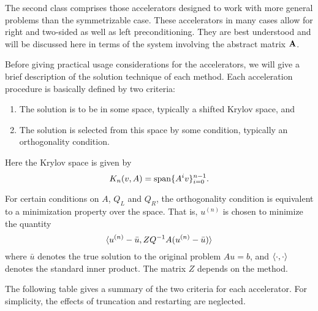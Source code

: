     The second class comprises those accelerators designed to work
with more general problems than the symmetrizable case.  These
accelerators in many cases allow for right and two-sided as well
as left preconditioning.  They are best understood and will be
discussed here in terms of the system involving the abstract matrix
${\bf A}$.

    Before giving practical usage considerations for the accelerators, 
we will give a brief description of the solution technique of each 
method.  Each acceleration procedure is basically defined by two 
criteria:
\begin{enumerate}
 \item The solution is to be in some space, typically a shifted 
       Krylov space, and 
 \item The solution is selected from this space by some condition, 
       typically an orthogonality condition.
\end{enumerate}
Here the Krylov space is given by 
\[ K_n(v,A)={\rm span}\{ A^i v\} _{i=0}^{n-1}. \]

    For certain conditions on $A$, $Q_L$ and $Q_R$, the orthogonality 
condition is equivalent to a minimization property over the space.  
That is, $u^{(n)}$ is chosen to minimize the quantity
\[ \langle u^{(n)}-\bar u,ZQ^{-1}A(u^{(n)}-\bar u)\rangle \]
where $\bar u$ denotes the true solution to the original problem $Au=b$, 
and $\langle\cdot ,\cdot \rangle$ denotes the standard inner product.  The 
matrix $Z$ depends on the method.

\smallskip
    The following table gives a summary of the two criteria for
each accelerator.  For simplicity, the effects of truncation and
restarting are neglected.

